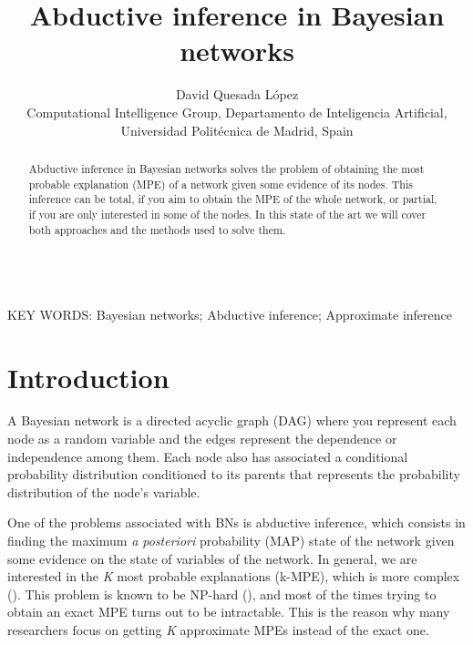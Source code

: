\documentclass[a4paper,11pt]{article}
\begin{document}
\title{Abductive inference in Bayesian networks}

\author{{David Quesada López}\\
{\small Computational Intelligence Group, Departamento de Inteligencia Artificial, Universidad Polit\'ecnica de Madrid, Spain}}

\date{}
\maketitle



\begin{abstract} Abductive inference in Bayesian networks solves the problem of obtaining the most probable explanation (MPE) of a network given some evidence of its nodes. This inference can be total, if you aim to obtain the MPE of the whole network, or partial, if you are only interested in some of the nodes. In this state of the art we will cover both approaches and the methods used to solve them.
\end{abstract}


\ \\
KEY WORDS: Bayesian networks; Abductive inference; Approximate inference


\section{Introduction}

A Bayesian network is a directed acyclic graph (DAG) where you represent each node as a random variable and the edges represent the dependence or independence among them. Each node also has associated a conditional probability distribution conditioned to its parents that represents the probability distribution of the node's variable.

One of the problems associated with BNs is abductive inference, which consists in finding the maximum \textit{a posteriori} probability (MAP) state of the network given some evidence on the state of variables of the network. In general, we are interested in the \textit{K} most probable explanations (k-MPE), which is more complex (\cite{seroussi1994}). This problem is known to be NP-hard (\cite{shimony1994}), and most of the times trying to obtain an exact MPE turns out to be intractable. This is the reason why many researchers focus on getting \textit{K} approximate MPEs instead of the exact one.
\end{document}
